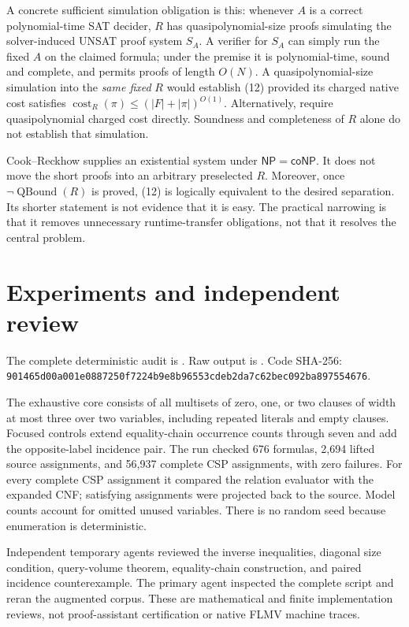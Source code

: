 \documentclass[11pt]{article}
\newcommand{\NP}{\mathsf{NP}}
\begin{document}
A concrete sufficient simulation obligation is this: whenever $A$ is a
correct polynomial-time SAT decider, $R$ has quasipolynomial-size proofs
simulating the solver-induced UNSAT proof system $S_A$. A verifier for $S_A$
can simply run the fixed $A$ on the claimed formula; under the premise it is
polynomial-time, sound and complete, and permits proofs of length $O(N)$.
A quasipolynomial-size simulation into the \emph{same fixed} $R$ would
establish (12) provided its charged native cost satisfies
$\operatorname{cost}_R(\pi)\le (|F|+|\pi|)^{O(1)}$.
Alternatively, require quasipolynomial charged cost directly.
Soundness and completeness of $R$ alone do not establish that simulation.

Cook--Reckhow supplies an existential system under $\NP=\mathsf{coNP}$.
It does not move the short proofs into an arbitrary preselected $R$.
Moreover, once $\neg\operatorname{QBound}(R)$ is proved, (12) is logically
equivalent to the desired separation. Its shorter statement is not evidence
that it is easy. The practical narrowing is that it removes unnecessary
runtime-transfer obligations, not that it resolves the central problem.

\section*{Experiments and independent review}
The complete deterministic audit is
.
Raw output is
.
Code SHA-256:
\texttt{901465d00a001e0887250f7224b9e8b96553cdeb2da7c62bec092ba897554676}.

The exhaustive core consists of all multisets of zero, one, or two clauses
of width at most three over two variables, including repeated literals and
empty clauses. Focused controls extend equality-chain occurrence counts
through seven and add the opposite-label incidence pair.
The run checked 676 formulas, 2,694 lifted source assignments, and 56,937
complete CSP assignments, with zero failures.
For every complete CSP assignment it compared the relation evaluator with
the expanded CNF; satisfying assignments were projected back to the source.
Model counts account for omitted unused variables.
There is no random seed because enumeration is deterministic.

Independent temporary agents reviewed the inverse inequalities, diagonal
size condition, query-volume theorem, equality-chain construction, and
paired incidence counterexample. The primary agent inspected the complete
script and reran the augmented corpus. These are mathematical and finite
implementation reviews, not proof-assistant certification or native
FLMV machine traces.
\end{document}
